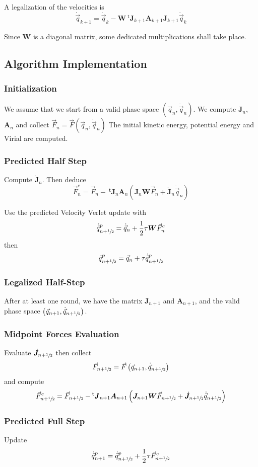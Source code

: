 \documentclass[11pt,aps,twocolumn]{revtex4}
\newcommand{\mymat}[1]{\boldsymbol{#1}}
\newcommand{\mytrn}[1]{{\!\!~^{\mathsf{t}}{#1}}}
\newcommand{\half}{\sfrac{1}{2}}
\newcommand{\q}{\vec{q}}
\newcommand{\dq}{\dot{\q}}
\newcommand{\J}{\mymat{J}}
\newcommand{\dJ}{\dot{\J}}
\newcommand{\tJ}{\mytrn{\J}}
\newcommand{\W}{\mymat{W}}
\newcommand{\A}{\mymat{A}}
\begin{document}
A legalization of the velocities is
$$
	\dq_{k+1} = \dq_{k} - \W \tJ_{k+1}  \A_{k+1} \J_{k+1} \dq_{k}
$$

Since $\W$ is a diagonal matrix, some dedicated multiplications shall take place.

\subsection{Algorithm Implementation}

\subsubsection{Initialization}
We assume that we start from a valid phase space $\left(\q_n,\dq_n\right)$.
We compute $\J_n$, $\A_n$ and collect $\vec{F}_n = \vec{F}\left(\q_n,\dq_n\right)$
The initial kinetic energy, potential energy and Virial are computed.

\subsubsection{Predicted Half Step}
\label{pred0}
Compute $\dJ_n$.
Then deduce $$\vec{F}^c_n=\vec{F}_n - \tJ_n\A_n\left(\J_n\W\vec{F}_n + \dJ_n\dq_n\right)$$

Use the predicted Velocity Verlet update with
$$
	\dq^p_{n+\half} = \dq_{n} + \frac{1}{2} \tau \W \vec{F}^c_{n}
$$
then
$$
	\q^p_{n+\half} = \q_{n} + \tau \dq^p_{n+\half}
$$

\subsubsection{Legalized Half-Step}
After at least one round, we have the matrix $\J_{n+1}$ and $\A_{n+1}$, and the
valid phase space $\left(\q_{n+1},\dq_{n+\half}\right)$.

\subsubsection{Midpoint Forces Evaluation}
Evaluate $\dJ_{n+\half}$ then collect
$$
	\vec{F}_{n+\half} = \vec{F}\left(\q_{n+1},\dq_{n+\half}\right)
$$
and compute
$$
	\vec{F}^c_{n+\half}=\vec{F}_{n+\half} - \tJ_{n+1}\A_{n+1}\left(\J_{n+1}\W\vec{F}_{n+\half} + \dJ_{n+\half}\dq_{n+\half}\right)
$$

\subsubsection{Predicted Full Step}
Update
$$
	\dq^p_{n+1} = \dq^p_{n+\half} + \frac{1}{2} \tau \vec{F}^c_{n+\half}
$$
\end{document}
